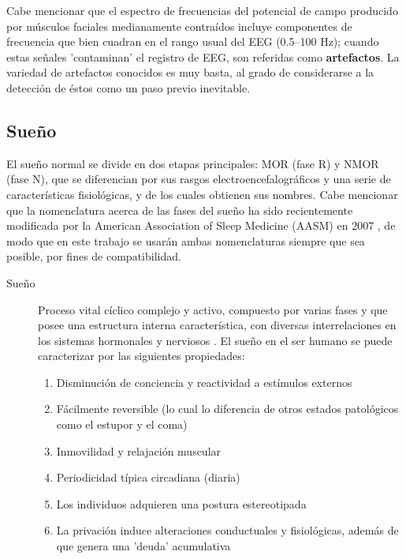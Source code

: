 Cabe mencionar que el espectro de frecuencias del potencial de campo producido por m\'usculos 
faciales medianamente contra\'idos incluye componentes de frecuencia que bien cuadran en el rango 
usual del EEG (0.5--100 Hz); cuando estas se\~nales 'contaminan' el registro de EEG, son referidas
como \textbf{artefactos}. La variedad de artefactos conocidos es muy basta, al grado de
considerarse a la detecci\'on de \'estos como un paso previo inevitable.


\subsection{Sue\~no}

El sue\~no normal se divide en dos etapas principales: MOR (fase R) y NMOR (fase N), que se 
diferencian por sus rasgos electroencefalogr\'aficos y una serie de caracter\'isticas 
fisiol\'ogicas, y de los cuales obtienen sus nombres.
Cabe mencionar que la nomenclatura acerca de las fases del sue\~no ha sido recientemente modificada 
por la American Association of Sleep Medicine (AASM) en 2007 \cite{AASM07}, de modo que en este 
trabajo se  usar\'an ambas nomenclaturas siempre que sea posible, por fines de compatibilidad.

\begin{description}
\item[Sue\~no] Proceso vital c\'iclico complejo y activo, compuesto por varias fases y que posee 
una estructura interna caracter\'istica, con diversas interrelaciones en los sistemas hormonales y 
nerviosos \cite{FernandezConde07}.
El sue\~no en el ser humano se puede caracterizar por las siguientes 
propiedades\cite{CarrilloMora}:
\begin{enumerate}
\item Disminuci\'on de conciencia y reactividad a est\'imulos externos
\item F\'acilmente reversible (lo cual lo diferencia de otros estados 
patol\'ogicos como el estupor y el coma)
\item Inmovilidad y relajaci\'on muscular
\item Periodicidad t\'ipica circadiana (diaria)
\item Los individuos adquieren una postura estereotipada
\item La privaci\'on induce alteraciones conductuales y 
fisiol\'ogicas, adem\'as de que genera una 'deuda' acumulativa
\end{enumerate}
\end{description}


